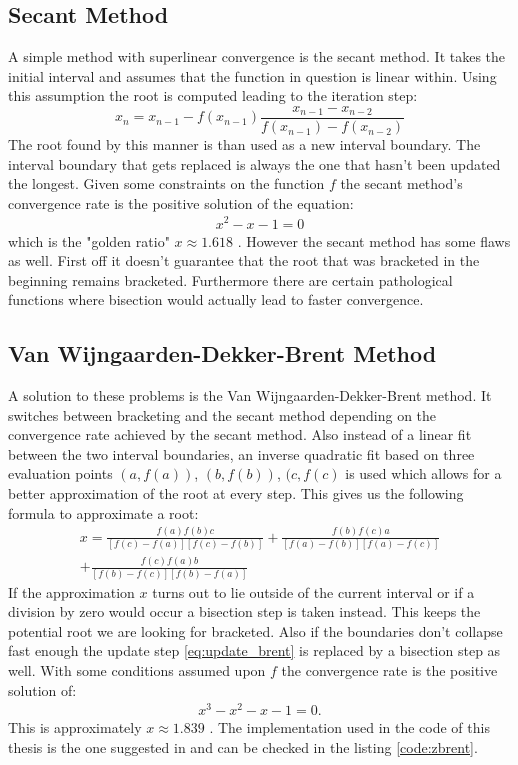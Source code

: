 \documentclass[a4paper, oneside]{discothesis}
\begin{document}
\subsection{Secant Method}
A simple method with superlinear convergence is the secant method. 
It takes the initial interval and assumes that the function in question is linear within.
Using this assumption the root is computed leading to the iteration step:
\begin{equation}
	x_n = x_{n-1} - f(x_{n-1})\frac{x_{n-1}-x_{n-2}}{f(x_{n-1})-f(x_{n-2})}
\end{equation}
The root found by this manner is than used as a new interval boundary.
The interval boundary that gets replaced is always the one that hasn't been updated the longest.
Given some constraints on the function $f$ the secant method's convergence rate is the positive solution of the equation:
\begin{align}
	x^2 -x -1 = 0
\end{align}
which is the "golden ratio" $x \approx 1.618$ \cite{doi:10.1002/9781118033128.ch3}.
However the secant method has some flaws as well.
First off it doesn't guarantee that the root that was bracketed in the beginning remains bracketed.
Furthermore there are certain pathological functions where bisection would actually lead to faster convergence.

\subsection{Van Wijngaarden-Dekker-Brent Method} 
A solution to these problems is the Van Wijngaarden-Dekker-Brent method. 
It switches between bracketing and the secant method depending on the convergence rate achieved by the secant method. 
Also instead of a linear fit between the two interval boundaries, an inverse quadratic fit based on three evaluation points $(a,f(a))$, $(b,f(b))$, $(c, f(c)$ is used which allows for a better approximation of the root at every step.
This gives us the following formula to approximate a root:
\begin{align}
	x  = \frac{f(a)f(b)c}{[f(c)-f(a)][f(c)-f(b)]} + \frac{f(b)f(c)a}{[f(a)-f(b)][f(a)-f(c)]} \\
	+\frac{f(c)f(a)b}{[f(b)-f(c)][f(b)-f(a)]} \label{eq:update_brent}
\end{align}
If the approximation $x$ turns out to lie outside of the current interval or if a division by zero would occur a bisection step is taken instead.
This keeps the potential root we are looking for bracketed.
Also if the boundaries don't collapse fast enough the update step \ref{eq:update_brent} is replaced by a bisection step as well.
With some conditions assumed upon $f$ the convergence rate is the positive solution of:
\begin{align}
	x^3 - x^2 - x -1 = 0.
\end{align}
This is approximately $x \approx 1.839$ \cite{brent1971algorithms}.
The implementation used in the code of this thesis is the one suggested in \cite{rf}
and can be checked in the listing \ref{code:zbrent}.
\end{document}
